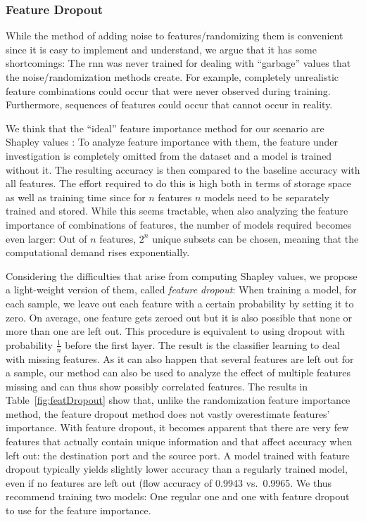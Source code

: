 \documentclass[conference]{IEEEtran}
\begin{document}
\subsubsection{Feature Dropout}
While the method of adding noise to features/randomizing them is convenient since it is easy to implement and understand, we argue that it has some shortcomings: 
The \gls{rnn} was never trained for dealing with ``garbage'' values that the noise/randomization methods create. For example, completely unrealistic feature combinations could occur that were never observed during training. Furthermore, sequences of features could occur that cannot occur in reality. 
 
We think that the ``ideal'' feature importance method for our scenario are Shapley values \cite{shapley_value_1953}: To analyze feature importance with them, the feature under investigation is completely omitted from the dataset and a model is trained without it. The resulting accuracy is then compared to the baseline accuracy with all features. The effort required to do this is high both in terms of storage space as well as training time since for $n$ features $n$ models need to be separately trained and stored. While this seems tractable, when also analyzing the feature importance of combinations of features, the number of models required becomes even larger: Out of $n$ features, $2^n$ unique subsets can be chosen, meaning that the computational demand rises exponentially. 

Considering the difficulties that arise from computing Shapley values, we propose a light-weight version of them, called \textit{feature dropout}: When training a model, for each sample, we leave out each feature with a certain probability by setting it to zero. On average, one feature gets zeroed out but it is also possible that none or more than one are left out. This procedure is equivalent to using dropout \cite{srivastava_dropout:_2014} with probability $\frac{1}{n}$ before the first layer. The result is the classifier learning to deal with missing features. As it can also happen that several features are left out for a sample, our method can also be used to analyze the effect of multiple features missing and can thus show possibly correlated features. The results in Table~\ref{fig:featDropout} show that, unlike the randomization feature importance method, the feature dropout method does not vastly overestimate features' importance. With feature dropout, it becomes apparent that there are very few features that actually contain unique information and that affect accuracy when left out: the destination port and the source port. A model trained with feature dropout typically yields slightly lower accuracy than a regularly trained model, even if no features are left out (flow accuracy of 0.9943 vs.~0.9965. We thus recommend training two models: One regular one and one with feature dropout to use for the feature importance. 
\end{document}
